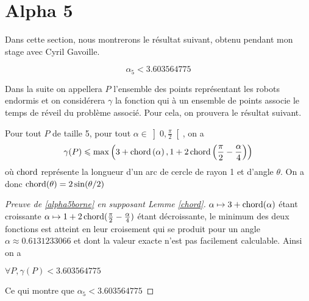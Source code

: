 \section{Alpha 5}

Dans cette section, nous montrerons le résultat suivant, obtenu pendant mon stage avec Cyril Gavoille.

\begin{theorem}\label{alpha5borne}

$$\alpha_5 < 3.603564775$$

\end{theorem}

Dans la suite on appellera $P$ l'ensemble des points représentant les robots endormis et on considérera $\gamma$ la fonction qui à un ensemble de points associe le temps de réveil du problème associé. Pour cela, on prouvera le résultat suivant.

\begin{lemma}\label{chord}
Pour tout $P$ de taille 5, pour tout $\alpha \in \left]0, \frac{\pi}{2}\right[$, on a
$$\gamma(P) \leqslant \max\left(3 + \operatorname{chord}\left(\alpha\right), 1 + 2\operatorname{chord}\left(\frac{\pi}{2} - \frac{\alpha}{4}\right)\right)$$
où $\operatorname{chord}$ représente la longueur d'un arc de cercle de rayon 1 et d'angle $\theta$. On a donc $\operatorname{chord}(\theta) = 2\sin(\theta/2)$
\end{lemma}

\begin{proof}[Preuve de \ref{alpha5borne} en supposant Lemme \ref{chord}]

$\alpha \mapsto 3+\operatorname{chord}(\alpha)$ étant croissante $\alpha \mapsto 1 +
2\operatorname{chord}(\frac{\pi}{2} - \frac{\alpha}{4})$ étant décroissante, le minimum des
deux fonctions est atteint en leur croisement qui se produit pour un angle
$\alpha \approx 0.6131233066$ et dont la valeur exacte n'est pas facilement calculable. Ainsi on a

\(\forall P, \gamma(P) < 3.603564775\)

Ce qui montre que $\alpha_5 < 3.603564775$

\end{proof}

